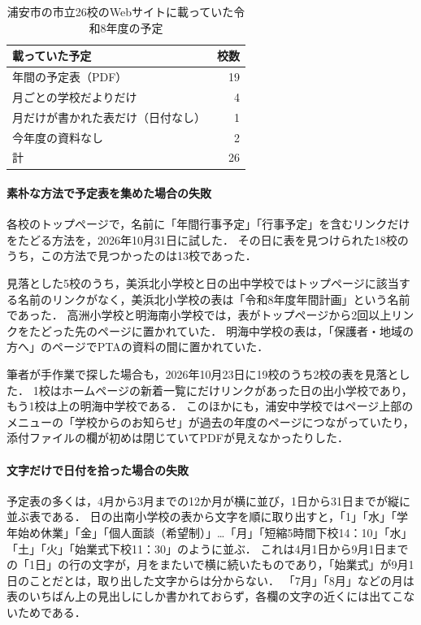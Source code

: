 \documentclass[a4paper,12pt,oneside]{jex}
\begin{document}
\begin{table}[htbp]
\centering
\caption{浦安市の市立26校のWebサイトに載っていた令和8年度の予定}
\label{tab:urayasu}
\begin{tabular}{lr}
\toprule
載っていた予定 & 校数 \\
\midrule
年間の予定表（PDF） & 19 \\
月ごとの学校だよりだけ & 4 \\
月だけが書かれた表だけ（日付なし） & 1 \\
今年度の資料なし & 2 \\
\midrule
計 & 26 \\
\bottomrule
\end{tabular}
\end{table}

\paragraph{素朴な方法で予定表を集めた場合の失敗}
各校のトップページで，名前に「年間行事予定」「行事予定」を含むリンクだけをたどる方法を，2026年10月31日に試した．
その日に表を見つけられた18校のうち，この方法で見つかったのは13校であった．

見落とした5校のうち，美浜北小学校と日の出中学校ではトップページに該当する名前のリンクがなく，美浜北小学校の表は「令和8年度年間計画」という名前であった．
高洲小学校と明海南小学校では，表がトップページから2回以上リンクをたどった先のページに置かれていた．
明海中学校の表は，「保護者・地域の方へ」のページでPTAの資料の間に置かれていた．

筆者が手作業で探した場合も，2026年10月23日に19校のうち2校の表を見落とした．
1校はホームページの新着一覧にだけリンクがあった日の出小学校であり，もう1校は上の明海中学校である．
このほかにも，浦安中学校ではページ上部のメニューの「学校からのお知らせ」が過去の年度のページにつながっていたり，添付ファイルの欄が初めは閉じていてPDFが見えなかったりした．

\paragraph{文字だけで日付を拾った場合の失敗}
予定表の多くは，4月から3月までの12か月が横に並び，1日から31日までが縦に並ぶ表である．
日の出南小学校の表から文字を順に取り出すと，「1」「水」「学年始め休業」「金」「個人面談（希望制）」…「月」「短縮5時間下校14：10」「水」「土」「火」「始業式下校11：30」のように並ぶ．
これは4月1日から9月1日までの「1日」の行の文字が，月をまたいで横に続いたものであり，「始業式」が9月1日のことだとは，取り出した文字からは分からない．
「7月」「8月」などの月は表のいちばん上の見出しにしか書かれておらず，各欄の文字の近くには出てこないためである．
\end{document}
